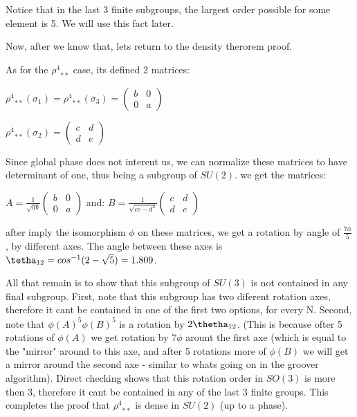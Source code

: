 \documentclass{article}
\begin{document}
Notice that in the last 3 finite subgroups, the largest order possible for some element is 5. We will use this fact later. 

Now, after we know that, lets return to the density therorem proof.

As for the ${\rho^{4}}_{**}$ case, its defined 2 matrices:

${\rho^{4}}_{**}(\sigma_{1}) = {\rho^{4}}_{**}(\sigma_{3}) = \begin{pmatrix} b & 0 \\ 0 & a \end{pmatrix}$

${\rho^{4}}_{**}(\sigma_{2}) =  \begin{pmatrix} c & d \\ d & e \end{pmatrix}$

Since global phase does not interent us, we can normalize these matrices to have determinant of one, thus being a subgroup of $SU(2)$. we get the matrices:

$A = \frac{1}{\sqrt{ab}} \begin{pmatrix}  b & 0 \\ 0 & a \end{pmatrix}$
and:
$B = \frac{1}{\sqrt{ce - d^{2}}}  \begin{pmatrix} c & d \\ d & e \end{pmatrix}$

after imply the isomorphism $\phi$ on these matrices, we get a rotation by angle of $\frac{7{\phi}}{5}$, by different axes. The angle between these axes is $\tetha_{12} = cos^{-1}(2 - \sqrt{5}) = 1.809$.

All that remain is to show that this subgroup of $SU(3)$ is not contained in any final subgroup. First, note that this subgroup has two diferent rotation axes, therefore it cant be contained in one of the first two options, for every N. Second, note that ${\phi(A)}^{5}{\phi(B)}^{5}$ is a rotation by $2\thetha_{12}$. (This is because ofter 5 rotations of $\phi(A)$ we get rotation by $7\phi$ arount the first axe (which is equal to the "mirror" around to this axe, and after 5 rotations more of $\phi(B)$ we will get a mirror around the second axe - similar to whats going on in the groover algorithm). Direct checking shows that this rotation order in $SO(3)$ is more then 3, therefore  it cant be contained in any of the last 3 finite groups. This completes the proof that  ${\rho^{4}}_{**}$ is dense in $SU(2)$ (up to a phase). 
\end{document}
